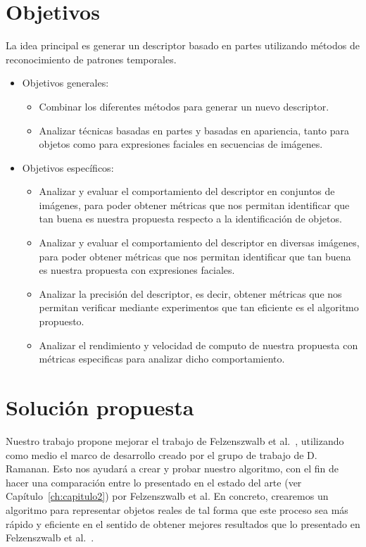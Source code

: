 \section{Objetivos}
La idea principal es generar un descriptor basado en partes utilizando métodos de reconocimiento de patrones temporales.
\begin{itemize}
		\item Objetivos generales:
			\begin{itemize}
				\item Combinar los diferentes métodos para generar un nuevo descriptor.
				\item Analizar técnicas basadas en partes y basadas en apariencia, tanto para objetos como para expresiones faciales en secuencias de imágenes.
			\end{itemize}
		\item Objetivos específicos:
			\begin{itemize}
				\item Analizar y evaluar el comportamiento del descriptor en conjuntos de imágenes, para poder obtener métricas que nos permitan identificar que tan buena es nuestra propuesta respecto a la identificación de objetos.
				\item Analizar y evaluar el comportamiento del descriptor en diversas imágenes, para poder obtener métricas que nos permitan identificar que tan buena es nuestra propuesta con expresiones faciales.
				\item Analizar la precisión del descriptor, es decir, obtener métricas que nos permitan verificar mediante experimentos que tan eficiente es el algoritmo propuesto.
				\item Analizar el rendimiento y velocidad de computo de nuestra propuesta con métricas especificas para analizar dicho comportamiento.
				
			\end{itemize}			

	\end{itemize}

\section{Solución propuesta}

Nuestro trabajo propone mejorar el trabajo de Felzenszwalb et al.~\cite{Felzenszwalb2010}, utilizando como medio el marco de desarrollo creado por el grupo de trabajo de D. Ramanan. Esto nos ayudará a crear y probar nuestro algoritmo, con el fin de hacer una comparación entre lo presentado en el estado del arte (ver Capítulo~\ref{ch:capitulo2}) por Felzenszwalb et al. En concreto, crearemos un algoritmo para representar objetos reales de tal forma que este proceso sea más rápido y eficiente en el sentido de obtener mejores resultados que lo presentado en Felzenszwalb et al.~\cite{Felzenszwalb2010}.


